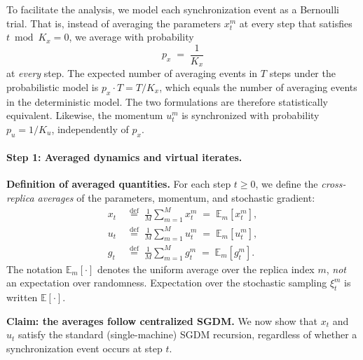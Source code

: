 \documentclass{article}
\begin{document}
To facilitate the analysis, we model each synchronization event as a Bernoulli
trial. That is, instead of averaging the parameters $x_t^m$ at every step that
satisfies $t \bmod K_x = 0$, we average with probability
\begin{equation}
\label{eq:prob_equiv}
p_x \;=\; \frac{1}{K_x}
\end{equation}
at \emph{every} step. The expected number of averaging events in $T$ steps under
the probabilistic model is $p_x \cdot T = T / K_x$, which equals the number of
averaging events in the deterministic model. The two formulations are therefore
statistically equivalent. Likewise, the momentum $u_t^m$ is synchronized with
probability $p_u = 1/K_u$, independently of $p_x$.

\paragraph{Step 1: Averaged dynamics and virtual iterates.}

\noindent\textbf{Definition of averaged quantities.}
For each step $t \geq 0$, we define the \emph{cross-replica averages} of the
parameters, momentum, and stochastic gradient:
\begin{align}
x_t &\;\stackrel{\text{def}}{=}\; \frac{1}{M}\sum_{m=1}^{M} x_t^m
     \;=\; \mathbb{E}_m[x_t^m], \label{eq:avg_x} \\[4pt]
u_t &\;\stackrel{\text{def}}{=}\; \frac{1}{M}\sum_{m=1}^{M} u_t^m
     \;=\; \mathbb{E}_m[u_t^m], \label{eq:avg_u} \\[4pt]
g_t &\;\stackrel{\text{def}}{=}\; \frac{1}{M}\sum_{m=1}^{M} g_t^m
     \;=\; \mathbb{E}_m[g_t^m]. \label{eq:avg_g}
\end{align}
The notation $\mathbb{E}_m[\cdot]$ denotes the uniform average over the
replica index $m$, \emph{not} an expectation over randomness. Expectation
over the stochastic sampling $\xi_t^m$ is written $\mathbb{E}[\cdot]$.

\medskip
\noindent\textbf{Claim: the averages follow centralized SGDM.}
We now show that $x_t$ and $u_t$ satisfy the standard (single-machine) SGDM
recursion, regardless of whether a synchronization event occurs at step $t$.
\end{document}
